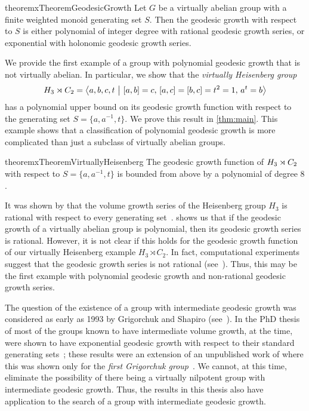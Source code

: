 \begin{restatable*}{theoremx}{TheoremGeodesicGrowth}\label{thm:geodesic-growth}
	Let $G$ be a virtually abelian group with a finite weighted monoid generating set $S$.
	Then the geodesic growth with respect to $S$ is either polynomial of integer degree with rational geodesic growth series, or exponential with holonomic geodesic growth series.
\end{restatable*}

We provide the first example of a group with polynomial geodesic growth that is not virtually abelian.
In particular, we show that the \emph{virtually Heisenberg group}
\[
	H_3 \rtimes C_2
	=
	\left\langle
		a,b,c,t
	\,\,\middle|\,\,
		[a,b] = c,\,
		[a,c] = [b,c] = t^2 = 1,\,
		a^t = b
	\right\rangle
\]
has a polynomial upper bound on its geodesic growth function with respect to the generating set $S = \{a,a^{-1},t\}$.
We prove this result in \cref{thm:main}.
This example shows that a classification of polynomial geodesic growth is more complicated than just a subclass of virtually abelian groups.

\begin{restatable*}{theoremx}{TheoremVirtuallyHeisenberg}\label{thm:main}
	The geodesic growth function of $H_3 \rtimes C_2$ with respect to $S = \{a,a^{-1},t\}$ is bounded from above by a polynomial of degree $8$.
\end{restatable*}

It was shown by \citeauthor{duchin2019} that the volume growth series of the Heisenberg group $H_3$ is rational with respect to every generating set~\cite{duchin2019}.
 shows us that if the geodesic growth of a virtually abelian group is polynomial, then its geodesic growth series is rational.
However, it is not clear if this holds for the geodesic growth function of our virtually Heisenberg example $H_3 \rtimes C_2$.
In fact, computational experiments suggest that the geodesic growth series is not rational (see~\cite{githubcode}).
Thus, this may be the first example with polynomial geodesic growth and non-rational geodesic growth series.

The question of the existence of a group with intermediate geodesic growth was considered as early as 1993 by Grigorchuk and Shapiro (see~\cite[756]{grigorchuk2014}).
In the PhD thesis of \citeauthor{broennimann2016} %
most of the groups known to have intermediate volume growth, at the time, were shown to have exponential geodesic growth with respect to their standard generating sets~\cite[Chapter~3]{broennimann2016};
these results were an extension of an unpublished work of \citeauthor{elder2006} where this was shown only for the \emph{first Grigorchuk group}~\cite{elder2006}.
We cannot, at this time, eliminate the possibility of there being a virtually nilpotent group with intermediate geodesic growth.
Thus, the results in this thesis also have application to the search of a group with intermediate geodesic growth.

